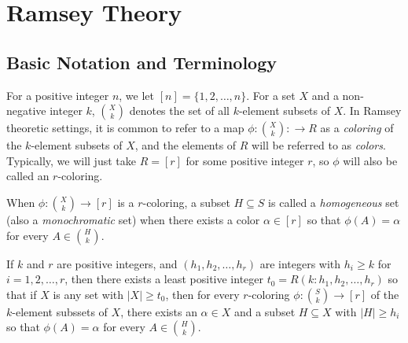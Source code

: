 \chapter{Ramsey Theory}



\section{Basic Notation and Terminology}\label{s:ramsey:intro}

For a positive integer $n$, we let $[n]=\{1,2,\dots,n\}$.
For a set $X$ and a non-negative integer $k$, $\binom{X}{k}$
denotes the set of all $k$-element subsets of $X$.  In Ramsey
theoretic settings, it is common to refer to a map
$\phi:\binom{X}{k}:\longrightarrow R$ as a \textit{coloring} of
the $k$-element subsets of $X$, and the elements of $R$ will
be referred to as \textit{colors}.  Typically, we will just take
$R=[r]$ for some positive integer $r$, so $\phi$ will also
be called an $r$-coloring.

When $\phi:\binom{X}{k}\longrightarrow [r]$ is a $r$-coloring, a 
subset $H\subseteq S$ is called a \textit{homogeneous} set 
(also a \textit{monochromatic} set) when there exists a color 
$\alpha\in[r]$ so that $\phi(A)=\alpha$ for every $A\in\binom{H}{k}$.

\begin{theorem}
If $k$ and $r$ are positive integers, and $(h_1,h_2,\dots,h_r)$
are integers with $h_i\ge k$ for $i=1,2,\dots,r$, then
there exists a least positive integer $t_0=R(k:h_1,h_2,\dots,h_r)$
so that if $X$ is any set with $|X|\ge t_0$,
then for every $r$-coloring $\phi:\binom{S}{k}\longrightarrow [r]$
of the $k$-element subssets of $X$,
there exists an $\alpha\in X$ and a subset $H\subseteq X$ with
$|H|\ge h_i$ so that $\phi(A) = \alpha$ for every $A\in
\binom{H}{k}$.
\end{theorem}

